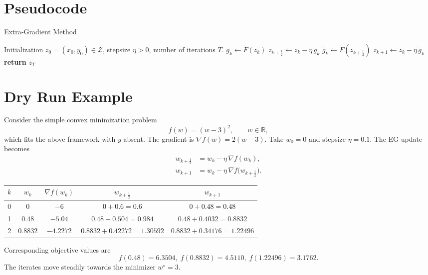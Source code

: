\documentclass{article}
\begin{document}
\section*{Pseudocode}
\begin{algorithm}[H]
\caption{Extra‑Gradient Method}
\begin{algorithmic}[1]
\Require Initialization $z_{0}=(x_{0},y_{0})\in\mathcal Z$, stepsize $\eta>0$, 
        number of iterations $T$.
    \State $g_{k}\gets F(z_{k})$ 
    \State $z_{k+\frac12}\gets z_{k}-\eta\,g_{k}$ 
    \State $\tilde g_{k}\gets F(z_{k+\frac12})$ 
    \State $z_{k+1}\gets z_{k}-\eta\,\tilde g_{k}$ 
\EndFor
\State \textbf{return} $z_{T}$
\end{algorithmic}
\end{algorithm}

\section*{Dry Run Example}
Consider the simple convex minimization problem
\[
f(w)=(w-3)^{2},\qquad w\in\mathbb R,
\]
which fits the above framework with $y$ absent.  
The gradient is $\nabla f(w)=2(w-3)$.  
Take $w_{0}=0$ and stepsize $\eta=0.1$. The EG update becomes
\[
\begin{aligned}
w_{k+\frac12}&=w_{k}-\eta\,\nabla f(w_{k}),\\
w_{k+1}&=w_{k}-\eta\,\nabla f\!\bigl(w_{k+\frac12}\bigr).
\end{aligned}
\]

\begin{center}
\begin{tabular}{c|c|c|c|c}
$k$ & $w_{k}$ & $\nabla f(w_{k})$ & $w_{k+\frac12}$ & $w_{k+1}$ \\ \hline
0 & $0$   & $-6$      & $0+0.6=0.6$   & $0+0.48=0.48$ \\
1 & $0.48$& $-5.04$   & $0.48+0.504=0.984$ & $0.48+0.4032=0.8832$ \\
2 & $0.8832$& $-4.2272$& $0.8832+0.42272=1.30592$ & $0.8832+0.34176=1.22496$ 
\end{tabular}
\end{center}
Corresponding objective values are
\[
f(0.48)=6.3504,\; f(0.8832)=4.5110,\; f(1.22496)=3.1762.
\]
The iterates move steadily towards the minimizer $w^{\star}=3$.

\end{document}
